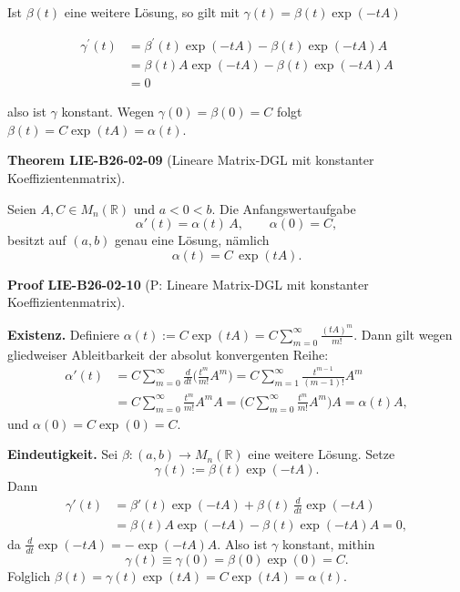 \documentclass[10pt, letterpaper]{article}
\newcommand{\CustomHeading}[3]{%
  \par\medskip\noindent%
  \textbf{#1 #2} \textnormal{(#3)}.\enskip%
}
\newenvironment{THEO}[2]{\begin{unitbox}\CustomHeading{Theorem}{#1}{#2}}{\end{unitbox}}
\newenvironment{PROOF}[2]{\begin{unitbox}\CustomHeading{Proof}{#1}{#2}}{\end{unitbox}}
\begin{document}
Ist $\beta(t)$ eine weitere Lösung, so gilt mit $\gamma(t)=\beta(t) \exp (-t A)$

$$
\begin{aligned}
\gamma^{\prime}(t) & =\beta^{\prime}(t) \exp (-t A)-\beta(t) \exp (-t A) A \\
& =\beta(t) A \exp (-t A)-\beta(t) \exp (-t A) A \\
& =0
\end{aligned}
$$

also ist $\gamma$ konstant. Wegen $\gamma(0)=\beta(0)=C$ folgt $\beta(t)=C \exp (t A)= \alpha(t)$.



\begin{THEO}{LIE-B26-02-09}{Lineare Matrix-DGL mit konstanter Koeffizientenmatrix}
Seien $A,C\in M_n(\mathbb{R})$ und $a<0<b$. Die Anfangswertaufgabe
\[
\alpha'(t)=\alpha(t)\,A,\qquad \alpha(0)=C,
\]
besitzt auf $(a,b)$ genau eine Lösung, nämlich
\[
\alpha(t)=C\,\exp(tA).
\]
\end{THEO}



\begin{PROOF}{LIE-B26-02-10}{P: Lineare Matrix-DGL mit konstanter Koeffizientenmatrix}
\textbf{Existenz.} Definiere $\alpha(t):=C\exp(tA)=C\sum_{m=0}^\infty \frac{(tA)^m}{m!}$. Dann gilt wegen gliedweiser Ableitbarkeit der absolut konvergenten Reihe:
\[
\begin{aligned}
\alpha'(t)
&= C\sum_{m=0}^\infty \frac{d}{dt}\Big(\frac{t^m}{m!}A^m\Big)
= C\sum_{m=1}^\infty \frac{t^{m-1}}{(m-1)!}A^m \\
&= C\sum_{m=0}^\infty \frac{t^{m}}{m!}A^{m}A
= \big(C\sum_{m=0}^\infty \frac{t^{m}}{m!}A^{m}\big)A
= \alpha(t)A,
\end{aligned}
\]
und $\alpha(0)=C\exp(0)=C$.

\medskip
\textbf{Eindeutigkeit.} Sei $\beta:(a,b)\to M_n(\mathbb{R})$ eine weitere Lösung. Setze
\[
\gamma(t):=\beta(t)\exp(-tA).
\]
Dann
\[
\begin{aligned}
\gamma'(t)
&=\beta'(t)\exp(-tA)+\beta(t)\,\frac{d}{dt}\exp(-tA) \\
&=\beta(t)A\exp(-tA)-\beta(t)\exp(-tA)A
=0,
\end{aligned}
\]
da $\frac{d}{dt}\exp(-tA)=-\exp(-tA)A$. Also ist $\gamma$ konstant, mithin
\[
\gamma(t)\equiv \gamma(0)=\beta(0)\exp(0)=C.
\]
Folglich $\beta(t)=\gamma(t)\exp(tA)=C\exp(tA)=\alpha(t)$.
\end{PROOF}
\end{document}
